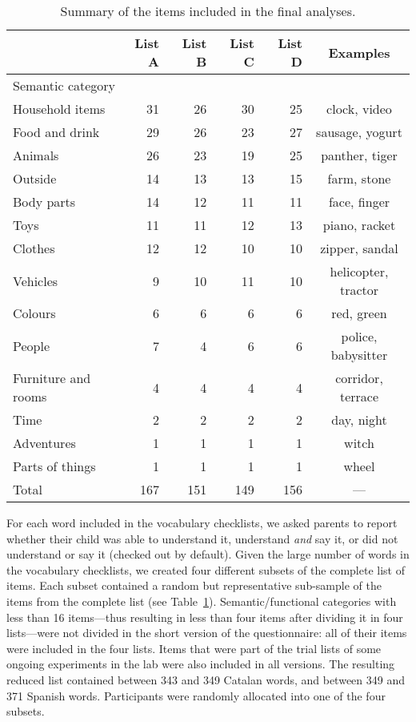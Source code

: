 \documentclass[
]{article}
\begin{document}
\hypertarget{tbl-items}{}
\begin{longtable}{l|rrrrc}
\caption{\label{tbl-items}Summary of the items included in the final analyses. }\tabularnewline

\toprule
\multicolumn{1}{l}{} & List A & List B & List C & List D & Examples \\ 
\midrule
\multicolumn{6}{l}{Semantic category} \\ 
\midrule
Household items & 31 & 26 & 30 & 25 & clock, video \\ 
Food and drink & 29 & 26 & 23 & 27 & sausage, yogurt \\ 
Animals & 26 & 23 & 19 & 25 & panther, tiger \\ 
Outside & 14 & 13 & 13 & 15 & farm, stone \\ 
Body parts & 14 & 12 & 11 & 11 & face, finger \\ 
Toys & 11 & 11 & 12 & 13 & piano, racket \\ 
Clothes & 12 & 12 & 10 & 10 & zipper, sandal \\ 
Vehicles & 9 & 10 & 11 & 10 & helicopter, tractor \\ 
Colours & 6 & 6 & 6 & 6 & red, green \\ 
People & 7 & 4 & 6 & 6 & police, babysitter \\ 
Furniture and rooms & 4 & 4 & 4 & 4 & corridor, terrace \\ 
Time & 2 & 2 & 2 & 2 & day, night \\ 
Adventures & 1 & 1 & 1 & 1 & witch \\ 
Parts of things & 1 & 1 & 1 & 1 & wheel \\ 
\midrule 
Total & 167 & 151 & 149 & 156 & — \\ 
\bottomrule
\end{longtable}

For each word included in the vocabulary checklists, we asked parents to
report whether their child was able to understand it, understand
\emph{and} say it, or did not understand or say it (checked out by
default). Given the large number of words in the vocabulary checklists,
we created four different subsets of the complete list of items. Each
subset contained a random but representative sub-sample of the items
from the complete list (see Table~\ref{tbl-items}). Semantic/functional
categories with less than 16 items---thus resulting in less than four
items after dividing it in four lists---were not divided in the short
version of the questionnaire: all of their items were included in the
four lists. Items that were part of the trial lists of some ongoing
experiments in the lab were also included in all versions. The resulting
reduced list contained between 343 and 349 Catalan words, and between
349 and 371 Spanish words. Participants were randomly allocated into one
of the four subsets.
\end{document}
